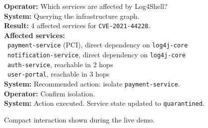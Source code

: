 \begin{figure}[t]
\centering
\begin{tcolorbox}[
  colback=gray!3,
  colframe=gray!55,
  fontupper=\scriptsize\ttfamily,
  boxrule=0.5pt,
  arc=2pt,
  left=3pt, right=3pt, top=2pt, bottom=2pt,
  title={\scriptsize\sffamily Demo Scenario: Log4Shell},
  fonttitle=\bfseries\scriptsize\sffamily
]
\textbf{Operator:} Which services are affected by Log4Shell?\\[2pt]
\textbf{System:} Querying the infrastructure graph.\\[2pt]
{\color{red}\textbf{Result:}} 4 affected services for \texttt{CVE-2021-44228}.\\[2pt]
\textbf{Affected services:}\\
\hspace*{0.5em}\textbullet\ \texttt{payment-service} (PCI), direct dependency on \texttt{log4j-core}\\
\hspace*{0.5em}\textbullet\ \texttt{notification-service}, direct dependency on \texttt{log4j-core}\\
\hspace*{0.5em}\textbullet\ \texttt{auth-service}, reachable in 2 hops\\
\hspace*{0.5em}\textbullet\ \texttt{user-portal}, reachable in 3 hops\\[2pt]
\textbf{System:} Recommended action: isolate \texttt{payment-service}.\\[2pt]
\textbf{Operator:} Confirm isolation.\\[2pt]
\textbf{System:} Action executed. Service state updated to \texttt{quarantined}.
\end{tcolorbox}
\caption{Compact interaction shown during the live demo.}
\label{fig:demo}
\end{figure}
